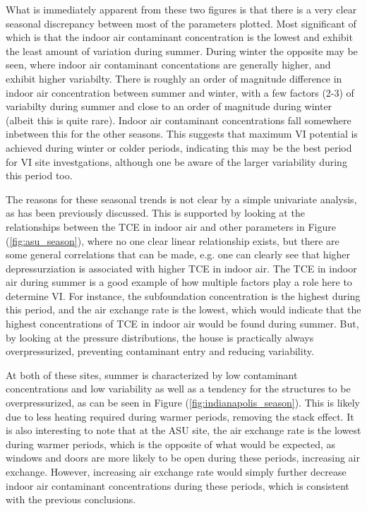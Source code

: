 \documentclass[journal=esthag,manuscript=article]{achemso}
\begin{document}
What is immediately apparent from these two figures is that there is a very clear seasonal discrepancy between most of the parameters plotted.
Most significant of which is that the indoor air contaminant concentration is the lowest and exhibit the least amount of variation during summer.
During winter the opposite may be seen, where indoor air contaminant concentations are generally higher, and exhibit higher variabilty.
There is roughly an order of magnitude difference in indoor air concentration between summer and winter, with a few factors (2-3) of variabilty during summer and close to an order of magnitude during winter (albeit this is quite rare).
Indoor air contaminant concentrations fall somewhere inbetween this for the other seasons.
This suggests that maximum VI potential is achieved during winter or colder periods, indicating this may be the best period for VI site investgations, although one be aware of the larger variability during this period too. \par

The reasons for these seasonal trends is not clear by a simple univariate analysis, as has been previously discussed.
This is supported by looking at the relationships between the TCE in indoor air and other parameters in Figure (\ref{fig:asu_season}), where no one clear linear relationship exists, but there are some general correlations that can be made, e.g. one can clearly see that higher depressurziation is associated with higher TCE in indoor air.
The TCE in indoor air during summer is a good example of how multiple factors play a role here to determine VI.
For instance, the subfoundation concentration is the highest during this period, and the air exchange rate is the lowest, which would indicate that the highest concentrations of TCE in indoor air would be found during summer.
But, by looking at the pressure distributions, the house is practically always overpressurized, preventing contaminant entry and reducing variability. \par

At both of these sites, summer is characterized by low contaminant concentrations and low variability as well as a tendency for the structures to be overpressurized, as can be seen in Figure (\ref{fig:indianapolis_season}).
This is likely due to less heating required during warmer periods, removing the stack effect.
It is also interesting to note that at the ASU site, the air exchange rate is the lowest during warmer periods, which is the opposite of what would be expected, as windows and doors are more likely to be open during these periods, increasing air exchange.
However, increasing air exchange rate would simply further decrease indoor air contaminant concentrations during these periods, which is consistent with the previous conclusions.
\end{document}
